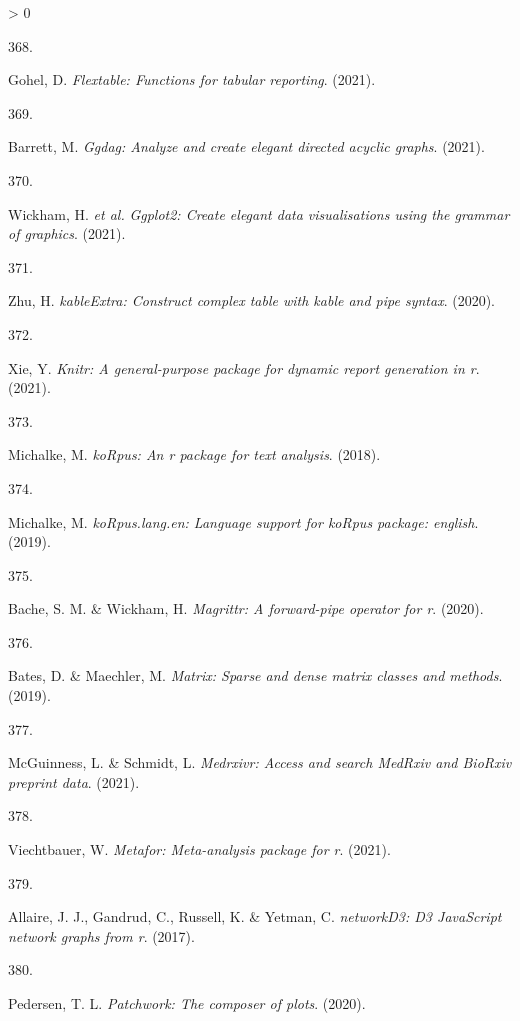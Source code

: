 \documentclass[a4paper, twoside]{templates/ociamthesis}
\newlength{\cslhangindent}
\newlength{\csllabelwidth}
\newenvironment{CSLReferences}[3] %
 {%
  \setlength{\parindent}{0pt}
  \ifodd #1 \everypar{\setlength{\hangindent}{\cslhangindent}}\ignorespaces\fi
  \ifnum #2 > 0
  \setlength{\parskip}{#2\baselineskip}
  \fi
 }%
 {}
\newcommand{\CSLLeftMargin}[1]{\parbox[t]{\maxof{\widthof{#1}}{\csllabelwidth}}{#1}}
\newcommand{\CSLRightInline}[1]{\parbox[t]{\linewidth - \csllabelwidth}{#1}}
\begin{document}
\begin{CSLReferences}{0}{0}
\leavevmode\hypertarget{ref-R-flextable}{}%
\CSLLeftMargin{368. }
\CSLRightInline{Gohel, D. \emph{Flextable: Functions for tabular reporting}. (2021).}

\leavevmode\hypertarget{ref-R-ggdag}{}%
\CSLLeftMargin{369. }
\CSLRightInline{Barrett, M. \emph{Ggdag: Analyze and create elegant directed acyclic graphs}. (2021).}

\leavevmode\hypertarget{ref-R-ggplot2}{}%
\CSLLeftMargin{370. }
\CSLRightInline{Wickham, H. \emph{et al.} \emph{Ggplot2: Create elegant data visualisations using the grammar of graphics}. (2021).}

\leavevmode\hypertarget{ref-R-kableExtra}{}%
\CSLLeftMargin{371. }
\CSLRightInline{Zhu, H. \emph{{kableExtra}: Construct complex table with kable and pipe syntax}. (2020).}

\leavevmode\hypertarget{ref-R-knitr}{}%
\CSLLeftMargin{372. }
\CSLRightInline{Xie, Y. \emph{Knitr: A general-purpose package for dynamic report generation in r}. (2021).}

\leavevmode\hypertarget{ref-R-koRpus}{}%
\CSLLeftMargin{373. }
\CSLRightInline{Michalke, M. \emph{{koRpus}: An r package for text analysis}. (2018).}

\leavevmode\hypertarget{ref-R-koRpus.lang.en}{}%
\CSLLeftMargin{374. }
\CSLRightInline{Michalke, M. \emph{{koRpus}.lang.en: Language support for {koRpus} package: english}. (2019).}

\leavevmode\hypertarget{ref-R-magrittr}{}%
\CSLLeftMargin{375. }
\CSLRightInline{Bache, S. M. \& Wickham, H. \emph{Magrittr: A forward-pipe operator for r}. (2020).}

\leavevmode\hypertarget{ref-R-Matrix}{}%
\CSLLeftMargin{376. }
\CSLRightInline{Bates, D. \& Maechler, M. \emph{Matrix: Sparse and dense matrix classes and methods}. (2019).}

\leavevmode\hypertarget{ref-R-medrxivr}{}%
\CSLLeftMargin{377. }
\CSLRightInline{McGuinness, L. \& Schmidt, L. \emph{Medrxivr: Access and search {MedRxiv} and {BioRxiv} preprint data}. (2021).}

\leavevmode\hypertarget{ref-R-metafor}{}%
\CSLLeftMargin{378. }
\CSLRightInline{Viechtbauer, W. \emph{Metafor: Meta-analysis package for r}. (2021).}

\leavevmode\hypertarget{ref-R-networkD3}{}%
\CSLLeftMargin{379. }
\CSLRightInline{Allaire, J. J., Gandrud, C., Russell, K. \& Yetman, C. \emph{{networkD3}: D3 {JavaScript} network graphs from r}. (2017).}

\leavevmode\hypertarget{ref-R-patchwork}{}%
\CSLLeftMargin{380. }
\CSLRightInline{Pedersen, T. L. \emph{Patchwork: The composer of plots}. (2020).}


\end{CSLReferences}
\end{document}
